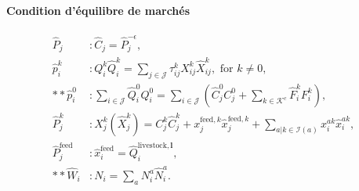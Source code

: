 \paragraph{Condition d’équilibre de marchés}
\begin{align}
    \hat{P}_j               & : \hat{C}_j=\hat{P}_j^{-\epsilon},                                                                                                                        \\
    \hat{p}_i^k             & : Q_i^k \hat{Q}_i^k = \sum_{j \in \mathcal{J}} \tau_{ij}^k X_{ij}^k \hat{X}_{ij}^k, \text{ for } k \neq 0,                                                \\
    ** \hat{p}_i^0          & : \sum_{i \in \mathcal{J}} \hat{Q}_i^0 Q_i^0 = \sum_{i \in \mathcal{J}} \left( \hat{C}_j^0 C_j^0  + \sum_{k \in \mathcal{K}^c} \hat{F}_i^k F_i^k \right), \\
    \hat{P}_j^k             & : X_j^k (\hat{X}_j^k) = C_j^k  \hat{C}_j^k + x_j^{\text{feed},k} \hat{x}_j^{\text{feed},k} + \sum_{a | k \in \mathcal{I}(a)} x_i^{ak} \hat{x}_i^{ak},     \\
    \hat{P}_j^{\text{feed}} & :\hat{x}_i^{\text{feed}}=\hat{Q}_i^{\text{livestock},\mathbf{l}},                                                                                         \\
    ** \hat{W}_i            & : N_i=\sum_a N_i^a \hat{N}_i^a.
\end{align}

